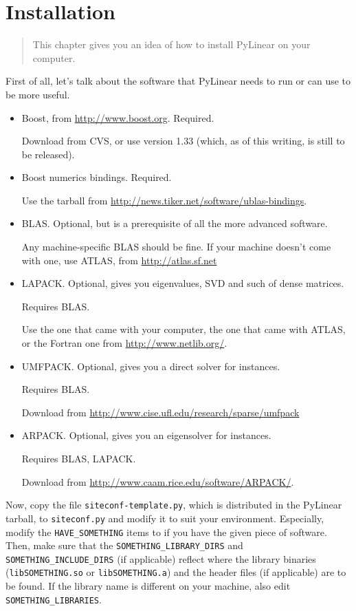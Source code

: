 \chapter{Installation}
\label{cha:installation}

\begin{quote}
   This chapter gives you an idea of how to install PyLinear on your 
   computer.
\end{quote}

First of all, let's talk about the software that PyLinear needs to run
or can use to be more useful.
\begin{itemize}
  \item Boost, from \url{http://www.boost.org}. Required.

    Download from CVS, or use version 1.33 (which, as of this writing, 
    is still to be released).
  \item Boost numerics bindings. Required.

    Use the tarball from \url{http://news.tiker.net/software/ublas-bindings}.
  \item BLAS. Optional, but is a prerequisite of all the more
    advanced software. 

    Any machine-specific BLAS should be fine. If your machine doesn't come
    with one, use ATLAS, from \url{http://atlas.sf.net}
  \item LAPACK. Optional, gives you eigenvalues, SVD and such of
    dense matrices.

    Requires BLAS.

    Use the one that came with your computer, the one that came with 
    ATLAS, or the Fortran one from \url{http://www.netlib.org/}.

  \item UMFPACK. Optional, gives you a direct solver for 
     instances.

    Requires BLAS.

    Download from \url{http://www.cise.ufl.edu/research/sparse/umfpack} 
  \item ARPACK. Optional, gives you an eigensolver for
     instances.

    Requires BLAS, LAPACK.

    Download from \url{http://www.caam.rice.edu/software/ARPACK/}.
\end{itemize}

Now, copy the file \texttt{siteconf-template.py}, which is distributed
in the PyLinear tarball, to \texttt{siteconf.py} and modify it to suit
your environment. Especially, modify the \texttt{HAVE_SOMETHING} items
to  if you have the given piece of software.  Then,
make sure that the \texttt{SOMETHING_LIBRARY_DIRS} and
\texttt{SOMETHING_INCLUDE_DIRS} (if applicable) reflect where the
library binaries (\texttt{libSOMETHING.so} or \texttt{libSOMETHING.a})
and the header files (if applicable) are to be found. If the library
name is different on your machine, also edit
\texttt{SOMETHING_LIBRARIES}.

